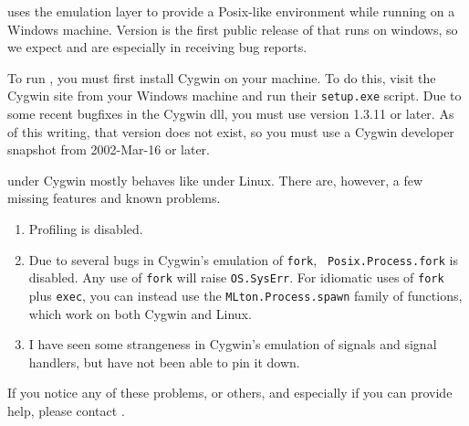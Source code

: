 
{\mlton} uses the  emulation
layer to provide a Posix-like environment while running on a Windows machine.
Version {\version} is the first public release of {\mlton} that runs on windows,
so we expect and are especially in receiving bug reports.

To run {\mlton}, you must first install Cygwin on your machine.  To do this,
visit the Cygwin site from your Windows machine and run their {\tt setup.exe}
script.  Due to some recent bugfixes in the Cygwin dll, you must use version
1.3.11 or later.  As of this writing, that version does not exist, so you must
use a Cygwin developer snapshot from 2002-Mar-16 or later.

{\mlton} under Cygwin mostly behaves like {\mlton} under Linux.  There are,
however, a few missing features and known problems.

\begin{enumerate}

\item Profiling is disabled.

\item Due to several bugs in Cygwin's emulation of {\tt fork}, {\tt
Posix.Process.fork} is disabled.  Any use of {\tt fork} will raise
{\tt OS.SysErr}.  For idiomatic uses of {\tt fork} plus {\tt exec},
you can instead use the {\tt MLton.Process.spawn} family of functions, which
work on both Cygwin and Linux.

\item I have seen some strangeness in Cygwin's emulation of signals and
signal handlers, but have not been able to pin it down.

\end{enumerate}

If you notice any of these problems, or others, and especially if you can
provide help, please contact {\mltonmail}.



